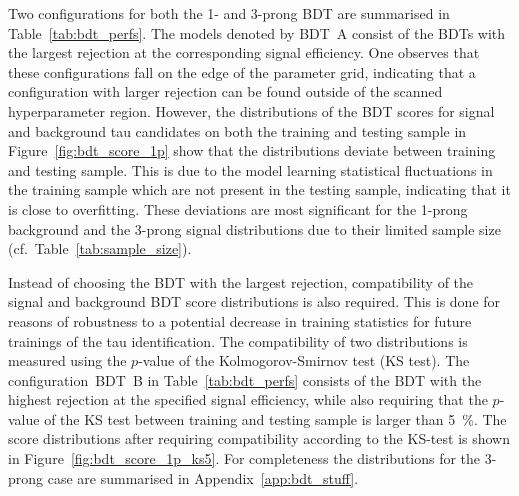 Two configurations for both the 1- and 3-prong BDT are summarised in
Table~\ref{tab:bdt_perfs}. The models denoted by \mbox{BDT A} consist of the
BDTs with the largest rejection at the corresponding signal efficiency. One
observes that these configurations fall on the edge of the parameter grid,
indicating that a configuration with larger rejection can be found outside of
the scanned hyperparameter region. However, the distributions of the BDT scores
for signal and background tau candidates on both the training and testing sample
in Figure~\ref{fig:bdt_score_1p} show that the distributions deviate between
training and testing sample. This is due to the model learning statistical
fluctuations in the training sample which are not present in the testing sample,
indicating that it is close to overfitting. These deviations are most
significant for the 1-prong background and the 3-prong signal distributions due
to their limited sample size (cf.\ Table~\ref{tab:sample_size}).


Instead of choosing the BDT with the largest rejection, compatibility of the
signal and background BDT score distributions is also required. This is done for
reasons of robustness to a potential decrease in training statistics for future
trainings of the tau identification. The compatibility of two distributions is
measured using the $p$-value of the Kolmogorov-Smirnov test (KS test). The
configuration~\mbox{BDT B} in Table~\ref{tab:bdt_perfs} consists of the BDT with
the highest rejection at the specified signal efficiency, while also requiring
that the $p$-value of the KS test between training and testing sample is larger
than \SI{5}{\percent}. The score distributions after requiring compatibility
according to the KS-test is shown in Figure~\ref{fig:bdt_score_1p_ks5}. For
completeness the distributions for the 3-prong case are summarised in
Appendix~\ref{app:bdt_stuff}.

